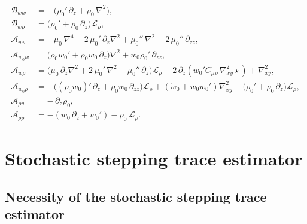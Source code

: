 \begin{appendices}
\begin{subequations}
\label{eq:A_B_operators}
\begin{align}
  \mathscr{B}_{ww}
  &=
  -\Big(\rho_0'\,\partial_z+\rho_0\,\nabla^2\Big), \\
  \mathscr{B}_{w\rho}
  &=
  \Big(\rho_0'+\rho_0\,\partial_z\Big)\mathscr{L}_{\rho}, \\
  \mathscr{A}_{ww}
  &=
  -\mu_0\,\nabla^4
  -2\,\mu_0'\,\partial_z\nabla^2
  +\mu_0''\,\nabla^2
  -2\,\mu_0''\,\partial_{zz}, \\
  \mathscr{A}_{w_0 w}
  &=
  \Big(\rho_0 w_0'+\rho_0 w_0\,\partial_z\Big)\nabla^2
  +w_0\rho_0'\,\partial_{zz}, \\
  \mathscr{A}_{w\rho}
  &=
  \Big(\mu_0\,\partial_z\nabla^2+2\,\mu_0'\,\nabla^2-\mu_0''\,\partial_z\Big)
  \mathscr{L}_{\rho}
  -2\,\partial_z\!\left(w_0'C_{\mu\rho}\,\nabla_{xy}^2\star\right)
  +\nabla_{xy}^2, \\
  \mathscr{A}_{w_0\rho}
  &=
  -\Big((\rho_0 w_0)'\,\partial_z+\rho_0 w_0\,\partial_{zz}\Big)
  \mathscr{L}_{\rho}
  +\left(\dot{w}_0+w_0 w_0'\right)\nabla_{xy}^2
  -\Big(\rho_0'+\rho_0\,\partial_z\Big)\dot{\mathscr{L}}_{\rho}, \\
  \mathscr{A}_{\rho w}
  &=
  -\,\partial_z\rho_0, \\
  \mathscr{A}_{\rho\rho}
  &=
  -\left(w_0\,\partial_z+w_0'\right)-\rho_0\,\mathscr{L}_{\rho}.
\end{align}
\end{subequations}

\section{Stochastic stepping trace estimator}
\label{sec:appendix_main}

\subsection{Necessity of the stochastic stepping trace estimator}
\label{sec:appendix_necessity_sste}


\end{appendices}
